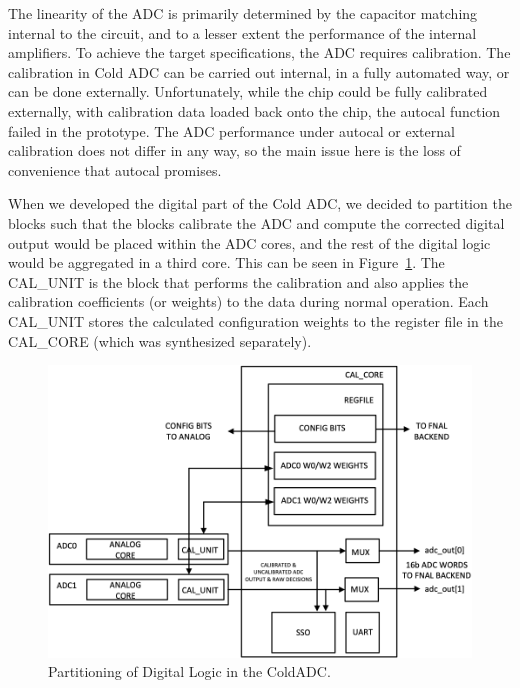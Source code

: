 \label{sec:5.1}


The linearity of the ADC is primarily determined by the capacitor matching internal to the circuit, and to a lesser extent the performance of the internal amplifiers. To achieve the target specifications, the ADC requires calibration. The calibration in Cold ADC can be carried out internal, in a fully automated way, or can be done externally. Unfortunately, while the chip could be fully calibrated externally, with calibration data loaded back onto the chip, the autocal function failed in the prototype. The ADC performance under autocal or external calibration does not differ in any way, so the main issue here is the loss of convenience that autocal promises.

When we developed the digital part of the Cold ADC, we decided to partition the blocks such that the blocks calibrate the ADC and compute the corrected digital output would be placed within the ADC cores, and the rest of the digital logic would be aggregated in a third core. This can be seen in Figure~\ref{fig:autocalBlock}. The CAL\_UNIT is the block that performs the calibration and also applies the calibration coefficients (or weights) to the data during normal operation. Each CAL\_UNIT stores the calculated configuration weights to the register file in the CAL\_CORE (which was synthesized separately).
\begin{figure}[h]
\centering
\begin{center}
\includegraphics[width=1.0\textwidth]{figures/autocalBlock.png}
\end{center}
\caption{Partitioning of Digital Logic in the ColdADC.}
\label{fig:autocalBlock}
\end{figure}


